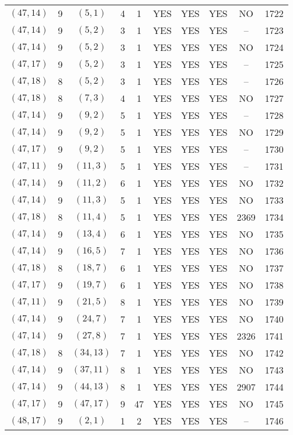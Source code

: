 \begin{longtable}{|c|c|c|c|c|c|c|c|c|c|}
$(47, 14)$ & 9 & $(5, 1)$ & 4 & 1 & YES & YES & YES & NO & 1722\\
$(47, 14)$ & 9 & $(5, 2)$ & 3 & 1 & YES & YES & YES & -- & 1723\\
$(47, 14)$ & 9 & $(5, 2)$ & 3 & 1 & YES & YES & YES & NO & 1724\\
$(47, 17)$ & 9 & $(5, 2)$ & 3 & 1 & YES & YES & YES & -- & 1725\\
$(47, 18)$ & 8 & $(5, 2)$ & 3 & 1 & YES & YES & YES & -- & 1726\\
$(47, 18)$ & 8 & $(7, 3)$ & 4 & 1 & YES & YES & YES & NO & 1727\\
$(47, 14)$ & 9 & $(9, 2)$ & 5 & 1 & YES & YES & YES & -- & 1728\\
$(47, 14)$ & 9 & $(9, 2)$ & 5 & 1 & YES & YES & YES & NO & 1729\\
$(47, 17)$ & 9 & $(9, 2)$ & 5 & 1 & YES & YES & YES & -- & 1730\\
$(47, 11)$ & 9 & $(11, 3)$ & 5 & 1 & YES & YES & YES & -- & 1731\\
$(47, 14)$ & 9 & $(11, 2)$ & 6 & 1 & YES & YES & YES & NO & 1732\\
$(47, 14)$ & 9 & $(11, 3)$ & 5 & 1 & YES & YES & YES & NO & 1733\\
$(47, 18)$ & 8 & $(11, 4)$ & 5 & 1 & YES & YES & YES & 2369 & 1734\\
$(47, 14)$ & 9 & $(13, 4)$ & 6 & 1 & YES & YES & YES & NO & 1735\\
$(47, 14)$ & 9 & $(16, 5)$ & 7 & 1 & YES & YES & YES & NO & 1736\\
$(47, 18)$ & 8 & $(18, 7)$ & 6 & 1 & YES & YES & YES & NO & 1737\\
$(47, 17)$ & 9 & $(19, 7)$ & 6 & 1 & YES & YES & YES & NO & 1738\\
$(47, 11)$ & 9 & $(21, 5)$ & 8 & 1 & YES & YES & YES & NO & 1739\\
$(47, 14)$ & 9 & $(24, 7)$ & 7 & 1 & YES & YES & YES & NO & 1740\\
$(47, 14)$ & 9 & $(27, 8)$ & 7 & 1 & YES & YES & YES & 2326 & 1741\\
$(47, 18)$ & 8 & $(34, 13)$ & 7 & 1 & YES & YES & YES & NO & 1742\\
$(47, 14)$ & 9 & $(37, 11)$ & 8 & 1 & YES & YES & YES & NO & 1743\\
$(47, 14)$ & 9 & $(44, 13)$ & 8 & 1 & YES & YES & YES & 2907 & 1744\\
$(47, 17)$ & 9 & $(47, 17)$ & 9 & 47 & YES & YES & YES & NO & 1745\\
$(48, 17)$ & 9 & $(2, 1)$ & 1 & 2 & YES & YES & YES & -- & 1746\\

\end{longtable}
